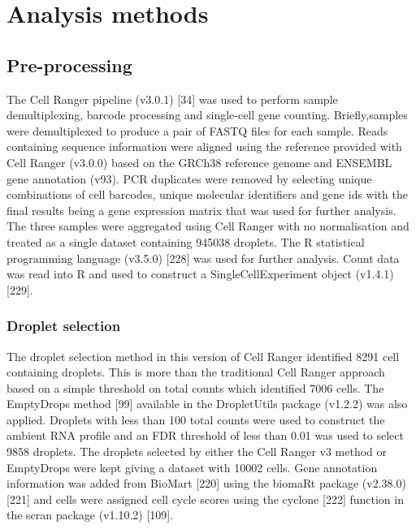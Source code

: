 \documentclass[11pt,a4paper,titlepage,twoside,openright]{style/unimelbthesis}
\theoremstyle{definition}
\theoremstyle{definition}
\theoremstyle{definition}
\theoremstyle{remark}
\begin{document}
\begin{mainmatter}
\hypertarget{analysis-methods}{%
\chapter{Analysis methods}\label{analysis-methods}}

\clearpage

\hypertarget{pre-processing-1}{%
\section{Pre-processing}\label{pre-processing-1}}

The Cell Ranger pipeline (v3.0.1) {[}34{]} was used to perform sample demultiplexing, barcode processing and single-cell gene counting. Briefly,samples were demultiplexed to produce a pair of FASTQ files for each sample. Reads containing sequence information were aligned using the reference provided with Cell Ranger (v3.0.0) based on the GRCh38 reference genome and ENSEMBL gene annotation (v93). PCR duplicates were removed by selecting unique combinations of cell barcodes, unique molecular identifiers and gene ids with the final results being a gene expression matrix that was used for further analysis. The three samples were aggregated using Cell Ranger with no normalisation and treated as a single dataset containing 945038 droplets. The R statistical programming language (v3.5.0) {[}228{]} was used for further analysis. Count data was read into R and used to construct a SingleCellExperiment object (v1.4.1) {[}229{]}.

\hypertarget{droplet-selection-1}{%
\subsection{Droplet selection}\label{droplet-selection-1}}

The droplet selection method in this version of Cell Ranger identified 8291 cell containing droplets. This is more than the traditional Cell Ranger approach based on a simple threshold on total counts which identified 7006 cells. The EmptyDrops method {[}99{]} available in the DropletUtils package (v1.2.2) was also applied. Droplets with less than 100 total counts were used to construct the ambient RNA profile and an FDR threshold of less than 0.01 was used to select 9858 droplets. The droplets selected by either the Cell Ranger v3 method or EmptyDrops were kept giving a dataset with 10002 cells. Gene annotation information was added from BioMart {[}220{]} using the biomaRt package (v2.38.0) {[}221{]} and cells were assigned cell cycle scores using the cyclone {[}222{]} function in the scran package (v1.10.2) {[}109{]}.


\end{mainmatter}
\end{document}
